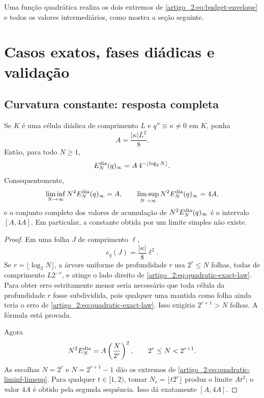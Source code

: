 Uma função quadrática realiza os dois extremos de \eqref{artigo_2:eq:budget-envelope} e todos os valores intermediários, como mostra a seção seguinte.

\section{Casos exatos, fases diádicas e validação}
\label{artigo_2:sec:dyadic-exact-cases}

\subsection{Curvatura constante: resposta completa}

\begin{theorem}\label{map:artigo_2:12.1}
\label{artigo_2:thm:quadratic-dyadic-constant}
Se $K$ é uma célula diádica de comprimento $L$ e
$q''\equiv\kappa\ne0$ em $K$, ponha
\begin{equation}
 A=\frac{|\kappa|L^2}{8}.
 \label{artigo_2:eq:quadratic-A}
\end{equation}
Então, para todo $N\ge1$,
\begin{equation}
 E_N^{\rm dia}(q)_\infty
 =A\,4^{-\lfloor\log_2N\rfloor}.
 \label{artigo_2:eq:quadratic-exact-law}
\end{equation}
Consequentemente,
\begin{equation}
 \liminf_{N\to\infty}N^2E_N^{\rm dia}(q)_\infty=A,
 \qquad
 \limsup_{N\to\infty}N^2E_N^{\rm dia}(q)_\infty=4A,
 \label{artigo_2:eq:quadratic-liminf-limsup}
\end{equation}
e o conjunto completo dos valores de acumulação de
$N^2E_N^{\rm dia}(q)_\infty$ é o intervalo $[A,4A]$. Em particular, a
constante obtida por um limite simples não existe.
\end{theorem}

\begin{proof}
Em uma folha $J$ de comprimento $\ell$,
\begin{equation}
 e_q(J)=\frac{|\kappa|}{8}\ell^2.
 \label{artigo_2:eq:quadratic-local-exact}
\end{equation}
Se $r=\lfloor\log_2N\rfloor$, a árvore uniforme de profundidade $r$ usa
$2^r\le N$ folhas, todas de comprimento $L2^{-r}$, e atinge o lado direito
de \eqref{artigo_2:eq:quadratic-exact-law}. Para obter erro estritamente menor seria
necessário que toda célula da profundidade $r$ fosse subdividida, pois
qualquer uma mantida como folha ainda teria o erro de
\eqref{artigo_2:eq:quadratic-exact-law}. Isso exigiria $2^{r+1}>N$ folhas. A fórmula
está provada.

Agora
\[
 N^2E_N^{\rm dia}=A\left(\frac{N}{2^r}\right)^2,
 \qquad 2^r\le N<2^{r+1}.
\]
As escolhas $N=2^r$ e $N=2^{r+1}-1$ dão os extremos de
\eqref{artigo_2:eq:quadratic-liminf-limsup}. Para qualquer $t\in[1,2)$, tomar
$N_r=\lfloor t2^r\rfloor$ produz o limite $At^2$; o valor $4A$ é obtido
pela segunda sequência. Isso dá exatamente $[A,4A]$.
\end{proof}


